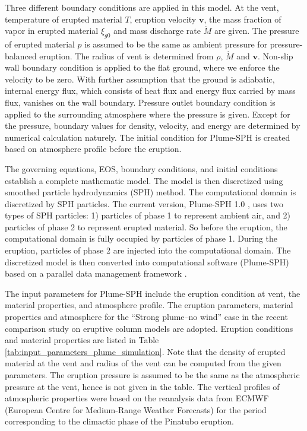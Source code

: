\documentclass[utf8]{frontiersSCNS} %
\begin{document}
Three different boundary conditions are applied in this model. At the vent, temperature of erupted material $T$, eruption velocity $\textbf{v}$, the mass fraction of vapor in erupted material $\xi_{g0}$ and mass discharge rate $\dot M$ are given. The pressure of erupted material $p$ is assumed to be the same as ambient pressure for pressure-balanced eruption. The radius of vent is determined from $\rho$, $\dot M$ and $\textbf{v}$.  Non-slip wall boundary condition is applied to the flat ground, where we enforce the velocity to be zero. With further assumption that the ground is adiabatic, internal energy flux, which consists of heat flux and energy flux carried by mass flux, vanishes on the wall boundary. Pressure outlet boundary condition is applied to the surrounding atmosphere where the pressure is given. Except for the pressure,  boundary values for density, velocity, and energy are determined by numerical calculation naturely. The initial condition for Plume-SPH is created based on atmosphere profile before the eruption. 

The governing equations,  EOS, boundary conditions, and initial conditions establish a complete mathematic model. The model is then discretized using smoothed particle hydrodynamics (SPH) method. The computational domain is discretized by SPH particles. The current version, Plume-SPH 1.0 \citep{cao2018plume}, uses two types of SPH particles: 1) particles of phase 1 to represent ambient air, and 2) particles of phase 2 to represent erupted material. So before the eruption, the computational domain is fully occupied by particles of phase 1. During the eruption, particles of phase 2 are injected into the computational domain. The discretized model is then converted into computational software (Plume-SPH) based on a parallel data management framework \citep{cao2017data}.

The input parameters for Plume-SPH include the eruption condition at vent, the material properties, and atmosphere profile. The eruption parameters, material properties and atmosphere for the ``Strong plume--no wind'' case in the recent comparison study on eruptive column models \citep {costa2016results} are adopted. Eruption conditions and material properties are listed in Table \ref{tab:input_parameters_plume_simulation}. Note that the density of erupted material at the vent and radius of the vent can be computed from the given parameters. The eruption pressure is assumed to be the same as the atmospheric pressure at the vent, hence is not given in the table. The vertical profiles of atmospheric properties were  based on the reanalysis data from ECMWF (European Centre for Medium-Range Weather Forecasts) for the period corresponding to the climactic phase of the Pinatubo eruption. 
\end{document}
